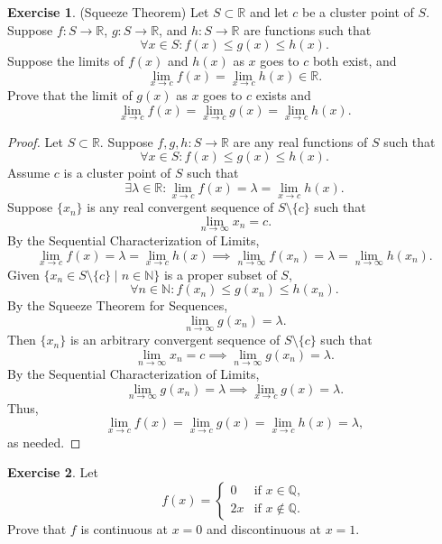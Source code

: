 \documentclass[12pt]{article}
\theoremstyle{definition}
\newtheorem{exercise}{Exercise}
\begin{document}
\thispagestyle{firstpage}

\begin{exercise}
    (Squeeze Theorem) Let \(S \subset \mathbb{R}\) and let \(c\) be a cluster point of \(S\). Suppose \(f : S \to \mathbb{R}\), \(g : S \to \mathbb{R}\), and \(h : S \to \mathbb{R}\) are functions such that
    \[
        \forall x \in S : f(x) \leq g(x) \leq h(x).
    \]
    Suppose the limits of \(f(x)\) and \(h(x)\) as \(x\) goes to \(c\) both exist, and
    \[
        \lim_{x \to c}f(x) = \lim_{x \to c}h(x) \in \mathbb{R}.
    \]
    Prove that the limit of \(g(x)\) as \(x\) goes to \(c\) exists and
    \[
        \lim_{x \to c}f(x) = \lim_{x \to c}g(x) = \lim_{x \to c}h(x).
    \]
\end{exercise}

\begin{proof}
    Let \(S \subset \mathbb{R}\). Suppose \(f,g,h : S \to \mathbb{R}\) are any real functions of \(S\) such that
    \[
        \forall x \in S : f(x) \leq g(x) \leq h(x).
    \]
    Assume \(c\) is a cluster point of \(S\) such that
    \[
        \exists \lambda \in \mathbb{R} : \lim_{x \to c}f(x) = \lambda = \lim_{x \to c}h(x).
    \]
    Suppose \(\{x_n\}\) is any real convergent sequence of \(S \setminus\{c\}\) such that
    \[
        \lim_{n \to \infty}x_n = c.
    \]
    By the Sequential Characterization of Limits,
    \[
        \lim_{x \to c}f(x) = \lambda = \lim_{x \to c}h(x) \implies \lim_{n \to \infty}f(x_n) = \lambda = \lim_{n \to \infty}h(x_n).
    \]
    Given \(\{x_n \in S \setminus \{c\} \mid n \in \mathbb{N}\}\) is a proper subset of \(S\),
    \[
        \forall n \in \mathbb{N} : f(x_n) \leq g(x_n) \leq h(x_n).
    \]
    By the Squeeze Theorem for Sequences,
    \[
        \lim_{n \to \infty}g(x_n) = \lambda.
    \]
    Then \(\{x_n\}\) is an arbitrary convergent sequence of \(S \setminus \{c\}\) such that
    \[
        \lim_{n \to \infty}x_n = c \implies \lim_{n \to \infty}g(x_n) = \lambda.
    \]
    By the Sequential Characterization of Limits,
    \[
        \lim_{n \to \infty}g(x_n) = \lambda \implies \lim_{x \to c}g(x) = \lambda.
    \]
    Thus,
    \[
        \lim_{x \to c}f(x) = \lim_{x \to c}g(x) = \lim_{x \to c}h(x) = \lambda,
    \]
    as needed.
\end{proof}

\begin{exercise}
    Let
    \[
        f(x) = \begin{cases}
            0 & \text{if } x \in \mathbb{Q}, \\
            2x & \text{if } x \not \in \mathbb{Q}.
        \end{cases}
    \]
    Prove that \(f\) is continuous at \(x = 0\) and discontinuous at \(x = 1\).
\end{exercise}
\end{document}
